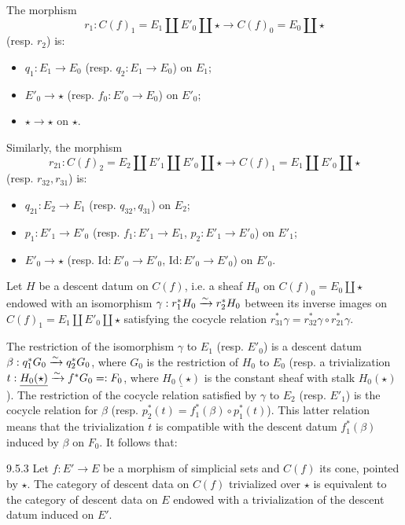 The morphism
\[
r_1:C(f)_1=E_1\coprod E'_0\coprod\star\to C(f)_0=E_0\coprod\star
\]
(resp. $r_2$) is:
\begin{itemize}
\item $q_1:E_1\to E_0$ (resp. $q_2:E_1\to E_0$) on $E_1$;
\item $E'_0\to\star$ (resp. $f_0:E'_0\to E_0$) on $E'_0$;
\item $\star\to\star$ on $\star$.
\end{itemize}
Similarly, the morphism
\[
r_{21}:C(f)_2=E_2\coprod E'_1\coprod E'_0\coprod\star\to C(f)_1=E_1\coprod E'_0\coprod\star
\]
(resp. $r_{32},r_{31}$) is:
\begin{itemize}
\item $q_{21}:E_2\to E_1$ (resp. $q_{32},q_{31}$) on $E_2$;
\item $p_1:E'_1\to E'_0$ (resp. $f_1:E'_1\to E_1$, $p_2:E'_1\to E'_0$) on $E'_1$;
\item $E'_0\to\star$ (resp. $\mathrm{Id}:E'_0\to E'_0$, $\mathrm{Id}:E'_0\to E'_0$) on $E'_0$.
\end{itemize}
Let $H$ be a descent datum on $C(f)$, i.e. a sheaf $H_0$ on $C(f)_0=E_0\coprod\star$ endowed with an isomorphism $\gamma:r_1^*H_0\xrightarrow{\sim} r_2^*H_0$ between its inverse images on $C(f)_1=E_1\coprod E'_0\coprod\star$ satisfying the cocycle relation $r_{31}^*\gamma=r_{32}^*\gamma\circ r_{21}^*\gamma$.

The restriction of the isomorphism $\gamma$ to $E_1$ (resp. $E'_0$) is a descent datum $\beta:q_1^*G_0\xrightarrow{\sim} q_2^*G_0$, where $G_0$ is the restriction of $H_0$ to $E_0$ (resp. a trivialization $t:\underline{H_0(\star)}\xrightarrow{\sim} f^*G_0=:F_0$, where $\underline{H_0(\star)}$ is the constant sheaf with stalk $H_0(\star)$). The restriction of the cocycle relation satisfied by $\gamma$ to $E_2$ (resp. $E'_1$) is the cocycle relation for $\beta$ (resp. $p_2^*(t)=f_1^*(\beta)\circ p_1^*(t)$). This latter relation means that the trivialization $t$ is compatible with the descent datum $f_1^*(\beta)$ induced by $\beta$ on $F_0$. It follows that:
\begin{proposition}{9.5.3}\label{X.9.5.3}
Let $f:E'\to E$ be a morphism of simplicial sets and $C(f)$ its cone, pointed by $\star$. The category of descent data on $C(f)$ trivialized over $\star$ is equivalent to the category of descent data on $E$ endowed with a trivialization of the descent datum induced on $E'$.
\end{proposition}

